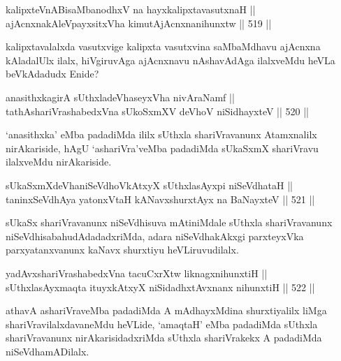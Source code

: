 \begin{shl}
kalipxteVnABisaMbanodhxV na hayxkalipxtavasutxnaH || \\
ajAcnxnakAleV\s payxsitxVha kimutAjAcnxnanihunxtw \hfill || 519 ||  
\end{shl}

\begin{artha}
kalipxtavalalxda vasutxvige kalipxta vasutxvina saMbaMdhavu ajAcnxna
kAladalUlx ilalx, hiVgiruvAga ajAcnxnavu nAshavAdAga ilalxveMdu heVLa
beVkAdadudx Enide?
\end{artha}


\begin{shl}
anasithxkagirA sUthxladeVhaseyxVha nivAraNamf || \\
tathA\s shariVrashabedxVna sUkoSxmXV deVhoV niSidhayxteV \hfill || 520 ||  
\end{shl}

\begin{artha}
`anasithxka' eMba padadiMda ililx sUthxla shariVravanunx Atamxnalilx
nirAkariside, hAgU `ashariVra'veMba padadiMda sUkaSxmX shariVravu
ilalxveMdu nirAkariside.
\end{artha}


\begin{shl}
sUkaSxmXdeVhaniSeVdhoVkAtxyX sUthxlasAyxpi niSeVdhataH || \\
taninxSeVdhAya yatonxV\s taH kANavxshurxtAyx na BaNayxteV \hfill || 521 ||  
\end{shl}

\begin{artha}
sUkaSx shariVravanunx niSeVdhisuva mAtiniMdale sUthxla shariVravanunx
niSeVdhisabahudAdadadxriMda, adara niSeVdhakAkxgi parxteyxVka
parxyatanxvanunx kaNavx shurxtiyu heVLiruvudilalx.
\end{artha}

\begin{shl}
yadAvx\s shariVrashabedxVna tacuCxrXtw liknagxnihunxtiH || \\
sUthxlasAyxmaqta ituyxkAtxyX niSidadhxtAvxnanx nihunxtiH \hfill || 522 ||  
\end{shl}

\begin{artha}
athavA ashariVraveMba padadiMda A mAdhayxMdina shurxtiyalilx liMga
shariVravilalxdavaneMdu heVLide, `amaqtaH' eMba padadiMda sUthxla
shariVravanunx nirAkarisidadxriMda sUthxla shariVrakekx A padadiMda
niSeVdhamADilalx.
\end{artha}

